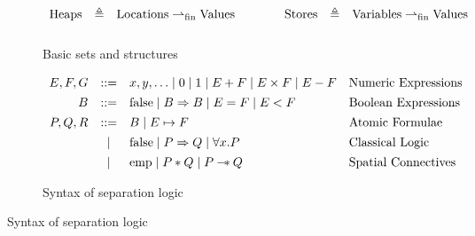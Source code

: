 \begin{figure}[htbp]
  \label{fig:sl}
    \centering
    \begin{subfigure}[t]{0.95\textwidth}
        \centering
        \[
        \begin{array}{rcl@{\qquad\qquad}rcl}
        \text{Heaps} & \triangleq & \text{Locations} \rightharpoonup_{\mathrm{fin}} \text{Values}
        & \text{Stores} & \triangleq & \text{Variables} \rightharpoonup_{\mathrm{fin}} \text{Values} \\[0.8em]
        \end{array}
        \]
        \caption{Basic sets and structures}
      \label{fig:sla}
    \end{subfigure} 

    \begin{subfigure}[t]{0.95\textwidth}
        \centering
        \[
        \begin{array}{rcll}
        E,F,G & ::= & x,y,\ldots \mid 0 \mid 1 \mid E + F \mid E \times F \mid E - F & \text{Numeric Expressions} \\[0.4em]
        B & ::= & \mathrm{false} \mid B \Rightarrow B \mid E = F \mid E < F  & \text{Boolean Expressions} \\[0.4em]
        P,Q,R & ::= & B \mid E \mapsto F & \text{Atomic Formulae} \\[0.4em]
              & \mid & \mathrm{false} \mid P \Rightarrow Q \mid \forall x.P & \text{Classical Logic} \\[0.4em]
              & \mid & \mathrm{emp} \mid P * Q \mid P \mathbin{-\!*} Q & \text{Spatial Connectives}
        \end{array}
        \]
        \caption{Syntax of separation logic}
    \end{subfigure}

    \vspace{1em}


\end{figure}
